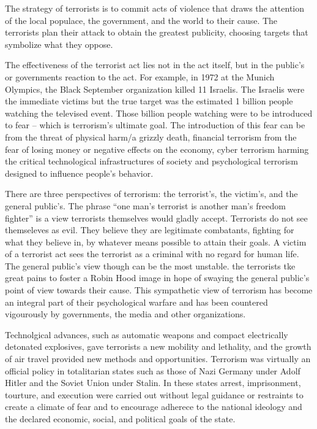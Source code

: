 \documentclass[
  openany]{book}
\begin{document}
The strategy of terrorists is to commit acts of violence that draws the attention of the local populace, the government, and the world to their cause. The terrorists plan their attack to obtain the greatest publicity, choosing targets that symbolize what they oppose.

The effectiveness of the terrorist act lies not in the act itself, but in the public's or governments reaction to the act. For example, in 1972 at the Munich Olympics, the Black September organization killed 11 Israelis. The Israelis were the immediate victims but the true target was the estimated 1 billion people watching the televised event. Those billion people watching were to be introduced to fear -- which is terrorism's ultimate goal. The introduction of this fear can be from the threat of physical harm/a grizzly death, financial terrorism from the fear of losing money or negative effects on the economy, cyber terrorism harming the critical technological infrastructures of society and psychological terrorism designed to influence people's behavior.

There are three perspectives of terrorism: the terrorist's, the victim's, and the general public's. The phrase ``one man's terrorist is another man's freedom fighter'' is a view terrorists themselves would gladly accept. Terrorists do not see themseleves as evil. They believe they are legitimate combatants, fighting for what they believe in, by whatever means possible to attain their goals. A victim of a terrorist act sees the terrorist as a criminal with no regard for human life. The general public's view though can be the most unstable. the terrorists tke great pains to foster a Robin Hood image in hope of swaying the general public's point of view towards their cause. This sympathetic view of terrorism has become an integral part of their psychological warfare and has been countered vigourously by governments, the media and other organizations.

Technolgical advances, such as automatic weapons and compact electrically detonated explosives, gave terrorists a new mobility and lethality, and the growth of air travel provided new methods and opportunities. Terrorism was virtually an official policy in totalitarian states such as those of Nazi Germany under Adolf Hitler and the Soviet Union under Stalin. In these states arrest, imprisonment, tourture, and execution were carried out without legal guidance or restraints to create a climate of fear and to encourage adherece to the national ideology and the declared economic, social, and political goals of the state.
\end{document}
